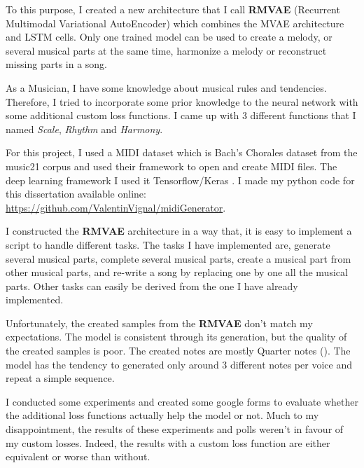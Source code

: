 \documentclass[12pt]{report}
\begin{document}
To this purpose, I created a new architecture that I call \textbf{RMVAE} (Recurrent Multimodal Variational AutoEncoder) which combines the MVAE architecture \cite{wu_multimodal_2018} and LSTM cells.
Only one trained model can be used to create a melody, or several musical parts at the same time, harmonize a melody or reconstruct missing parts in a song.

As a Musician, I have some knowledge about musical rules and tendencies.
Therefore, I tried to incorporate some prior knowledge to the neural network with some additional custom loss functions.
I came up with 3 different functions that I named \textit{Scale}, \textit{Rhythm} and \textit{Harmony}.

For this project, I used a MIDI dataset which is Bach's Chorales dataset from the music21 corpus \cite{noauthor_music21corpuschorales_nodate} and used their framework \cite{noauthor_music21_nodate} to open and create MIDI files.
The deep learning framework I used it Tensorflow/Keras \cite{noauthor_tensorflow_nodate, noauthor_keras_nodate}.
I made my python code for this dissertation available online: \url{https://github.com/ValentinVignal/midiGenerator}.

I constructed the \textbf{RMVAE} architecture in a way that, it is easy to implement a script to handle different tasks.
The tasks I have implemented are, generate several musical parts, complete several musical parts, create a musical part from other musical parts, and re-write a song by replacing one by one all the musical parts.
Other tasks can easily be derived from the one I have already implemented.

Unfortunately, the created samples from the \textbf{RMVAE} don't match my expectations.
The model is consistent through its generation, but the quality of the created samples is poor.
The created notes are mostly Quarter notes (\musQuarter).
The model has the tendency to generated only around 3 different notes per voice and repeat a simple sequence.

I conducted some experiments and created some google forms to evaluate whether the additional loss functions actually help the model or not.
Much to my disappointment, the results of these experiments and polls weren't in favour of my custom losses.
Indeed, the results with a custom loss function are either equivalent or worse than without.


\end{document}

